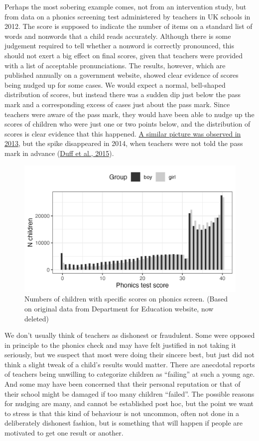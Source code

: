 \documentclass{krantz}
\begin{document}
Perhaps the most sobering example comes, not from an intervention study, but from data on a phonics screening test administered by teachers in UK schools in 2012. The score is supposed to indicate the number of items on a standard list of words and nonwords that a child reads accurately. Although there is some judgement required to tell whether a nonword is correctly pronounced, this should not exert a big effect on final scores, given that teachers were provided with a list of acceptable pronunciations. The results, however, which are published annually on a government website, showed clear evidence of scores being nudged up for some cases. We would expect a normal, bell-shaped distribution of scores, but instead there was a sudden dip just below the pass mark and a corresponding excess of cases just about the pass mark. Since teachers were aware of the pass mark, they would have been able to nudge up the scores of children who were just one or two points below, and the distribution of scores is clear evidence that this happened. \href{http://deevybee.blogspot.com/2013/10/good-and-bad-news-on-phonics-screen.html}{A similar picture was observed in 2013}, but the spike disappeared in 2014, when teachers were not told the pass mark in advance (\protect\hyperlink{ref-duff2015}{Duff et al., 2015}).

\begin{figure}
\includegraphics[width=0.8\linewidth]{images_bw/phonics} \caption{Numbers of children with specific scores on phonics screen. (Based on original data from Department for Education website, now deleted)}\label{fig:phonicsfig}
\end{figure}

We don't usually think of teachers as dishonest or fraudulent. Some were opposed in principle to the phonics check and may have felt justified in not taking it seriously, but we suspect that most were doing their sincere best, but just did not think a slight tweak of a child's results would matter. There are anecdotal reports of teachers being unwilling to categorize children as ``failing'' at such a young age. And some may have been concerned that their personal reputation or that of their school might be damaged if too many children ``failed''. The possible reasons for nudging are many, and cannot be established post hoc, but the point we want to stress is that this kind of behaviour is not uncommon, often not done in a deliberately dishonest fashion, but is something that will happen if people are motivated to get one result or another.
\end{document}
